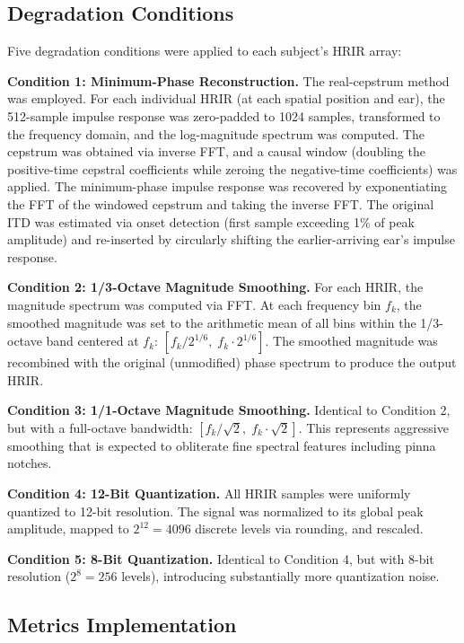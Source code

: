 \documentclass[12pt,a4paper]{article}
\begin{document}
\subsection{Degradation Conditions}

Five degradation conditions were applied to each subject's HRIR array:

\textbf{Condition 1: Minimum-Phase Reconstruction.}
The real-cepstrum method was employed. For each individual HRIR (at each spatial position and ear), the 512-sample impulse response was zero-padded to 1024 samples, transformed to the frequency domain, and the log-magnitude spectrum was computed. The cepstrum was obtained via inverse FFT, and a causal window (doubling the positive-time cepstral coefficients while zeroing the negative-time coefficients) was applied. The minimum-phase impulse response was recovered by exponentiating the FFT of the windowed cepstrum and taking the inverse FFT. The original ITD was estimated via onset detection (first sample exceeding 1\% of peak amplitude) and re-inserted by circularly shifting the earlier-arriving ear's impulse response.

\textbf{Condition 2: 1/3-Octave Magnitude Smoothing.}
For each HRIR, the magnitude spectrum was computed via FFT. At each frequency bin $f_k$, the smoothed magnitude was set to the arithmetic mean of all bins within the 1/3-octave band centered at $f_k$: $[f_k / 2^{1/6},\; f_k \cdot 2^{1/6}]$. The smoothed magnitude was recombined with the original (unmodified) phase spectrum to produce the output HRIR.

\textbf{Condition 3: 1/1-Octave Magnitude Smoothing.}
Identical to Condition 2, but with a full-octave bandwidth: $[f_k / \sqrt{2},\; f_k \cdot \sqrt{2}]$. This represents aggressive smoothing that is expected to obliterate fine spectral features including pinna notches.

\textbf{Condition 4: 12-Bit Quantization.}
All HRIR samples were uniformly quantized to 12-bit resolution. The signal was normalized to its global peak amplitude, mapped to $2^{12} = 4096$ discrete levels via rounding, and rescaled.

\textbf{Condition 5: 8-Bit Quantization.}
Identical to Condition 4, but with 8-bit resolution ($2^8 = 256$ levels), introducing substantially more quantization noise.

\subsection{Metrics Implementation}
\end{document}
